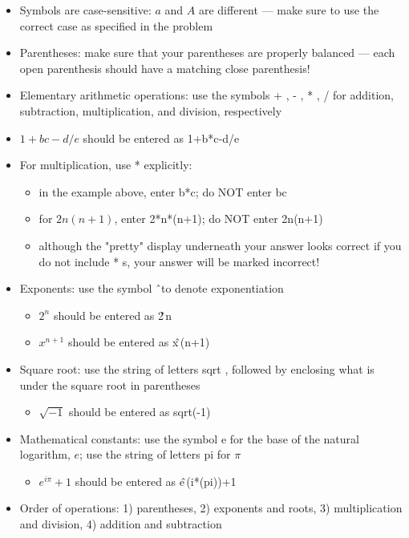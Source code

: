 \documentclass[pdftex, brazil, 12pt, twoside]{article}
\begin{document}
\begin{itemize}[noitemsep]
\item Symbols are case-sensitive: $a$ and $A$ are different --- make sure to use
  the correct case as specified in the problem
\item Parentheses: make sure that your parentheses are properly balanced --- each
  open parenthesis should have a matching close parenthesis!
\item Elementary arithmetic operations: use the symbols + , - , * , / for addition,
  subtraction, multiplication, and division, respectively
\item $1+bc-d/e$ should be entered as 1+b*c-d/e
\item For multiplication, use * explicitly:
  \begin{itemize}[noitemsep]
  \item in the example above, enter b*c; do NOT enter bc
  \item for $2n(n+1)$, enter 2*n*(n+1); do NOT enter 2n(n+1)
  \item although the "pretty" display underneath your answer looks correct if
    you do not include * s, your answer will be marked incorrect!
  \end{itemize}
\item Exponents: use the symbol \^\ to denote exponentiation
  \begin{itemize}[noitemsep]
  \item $2^n$ should be entered as 2\^\,n
  \item $x^{n+1}$ should be entered as x\^\,(n+1)
  \end{itemize}
\item Square root: use the string of letters sqrt , followed by enclosing what
  is under the square root in parentheses
  \begin{itemize}[noitemsep]
  \item $\sqrt{-1}$ should be entered as sqrt(-1)
  \end{itemize}
\item Mathematical constants: use the symbol e for the base of the natural logarithm,
  $e$; use the string of letters pi for $\pi$
  \begin{itemize}[noitemsep]
  \item $e^{i\pi}+1$ should be entered as e\^\,(i*(pi))+1
  \end{itemize}
\item Order of operations: 1) parentheses, 2) exponents and roots,
  3) multiplication and division, 4) addition and subtraction

\end{itemize}
\end{document}
